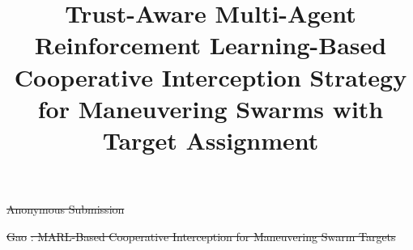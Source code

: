\documentclass[lettersize,journal]{IEEEtran}
\providecommand{\DIFdel}[1]{{\protect\color{red}\sout{#1}}}                      %
\providecommand{\DIFaddbegin}{} %
\providecommand{\DIFaddend}{} %
\providecommand{\DIFdelbegin}{} %
\providecommand{\DIFdelend}{} %
\newcommand{\DIFscaledelfig}{0.5}
\newlength{\DIFdelgraphicswidth} %
\newlength{\DIFdelgraphicsheight} %
\newcommand{\DIFaddincludegraphics}[2][]{{\color{blue}\fbox{\DIFOincludegraphics[#1]{#2}}}} %
\newcommand{\DIFdelincludegraphics}[2][]{%
\sbox{\DIFdelgraphicsbox}{\DIFOincludegraphics[#1]{#2}}%
\settoboxwidth{\DIFdelgraphicswidth}{\DIFdelgraphicsbox} %
\settoboxtotalheight{\DIFdelgraphicsheight}{\DIFdelgraphicsbox} %
\scalebox{\DIFscaledelfig}{%
\parbox[b]{\DIFdelgraphicswidth}{\usebox{\DIFdelgraphicsbox}\\[-\baselineskip] \rule{\DIFdelgraphicswidth}{0em}}\llap{\resizebox{\DIFdelgraphicswidth}{\DIFdelgraphicsheight}{%
\setlength{\unitlength}{\DIFdelgraphicswidth}%
\begin{picture}(1,1)%
\thicklines\linethickness{2pt} %
{\color[rgb]{1,0,0}\put(0,0){\framebox(1,1){}}}%
{\color[rgb]{1,0,0}\put(0,0){\line( 1,1){1}}}%
{\color[rgb]{1,0,0}\put(0,1){\line(1,-1){1}}}%
\end{picture}%
}\hspace*{3pt}}} %
} %
\DeclareRobustCommand{\DIFaddbegin}{\DIFOaddbegin \let\includegraphics\DIFaddincludegraphics} %
\DeclareRobustCommand{\DIFaddend}{\DIFOaddend \let\includegraphics\DIFOincludegraphics} %
\DeclareRobustCommand{\DIFdelbegin}{\DIFOdelbegin \let\includegraphics\DIFdelincludegraphics} %
\DeclareRobustCommand{\DIFdelend}{\DIFOaddend \let\includegraphics\DIFOincludegraphics} %
\begin{document}
\DIFdelbegin %

\DIFdelend \title{Trust-Aware Multi-Agent Reinforcement Learning-Based Cooperative Interception Strategy for Maneuvering Swarms with Target Assignment}



\DIFdelbegin %

\DIFdelend \author{}
\DIFdelbegin %
\DIFdel{Anonymous Submission}%
\DIFdelend \DIFaddbegin {}
\DIFaddend 

\DIFdelbegin %
\DIFdel{Gao }%
\DIFdel{: MARL-Based Cooperative Interception for Maneuvering Swarm Targets}%
\DIFdelend \DIFaddbegin {}
\DIFaddend 

\maketitle
\end{document}
